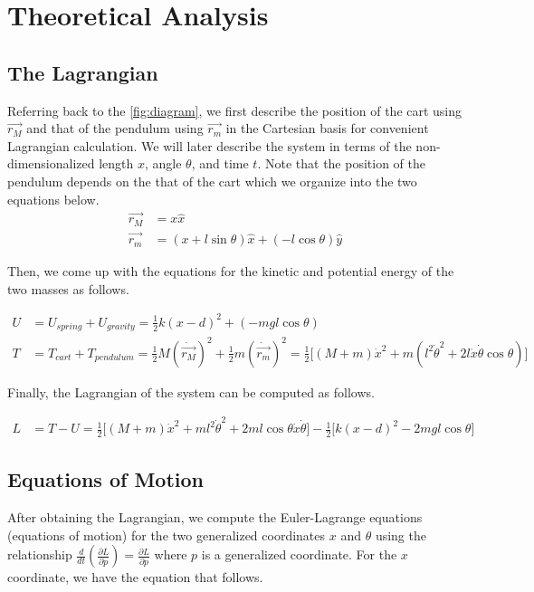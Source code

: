 \documentclass[12pt]{article}
\begin{document}
\section{Theoretical Analysis}
\subsection{The Lagrangian}

Referring back to the \autoref{fig:diagram}, we first describe the position of the cart using $\Vec{r_M}$ and that of the pendulum using $\Vec{r_m}$ in the Cartesian basis for convenient Lagrangian calculation. We will later describe the system in terms of the non-dimensionalized length $x$, angle $\theta$, and time $t$. Note that the position of the pendulum depends on the that of the cart which we organize into the two equations below.
\begin{align}
	\Vec{r_M} &= x \hat{x} \label{eq:r_M} \\
    \Vec{r_m} &= (x + l\sin{\theta}) \hat{x} + (-l\cos{\theta}) \hat{y} \label{eq:r_m}
\end{align}

Then, we come up with the equations for the kinetic and potential energy of the two masses as follows.

\begin{align}
	U &= U_{spring} + U_{gravity} = \frac{1}{2}k(x-d)^2 + (-mgl\cos{\theta})
      \label{eq:U} \\
    T &= T_{cart} + T_{pendulum} = \frac{1}{2}M(\dot{\Vec{r_M}})^2 + \frac{1}{2}m(\dot{\Vec{r_m}})^2 = \frac{1}{2} \big[ (M+m)\dot{x}^2 + m(l^2\dot{\theta}^2 + 2l\dot{x}\dot{\theta}\cos{\theta}) \big] \label{eq:T}
\end{align}

Finally, the Lagrangian of the system can be computed as follows.

\begin{align}
    L &= T - U = \frac{1}{2} \big[ (M+m)\dot{x}^2 + ml^2\dot{\theta}^2 + 2ml\cos{\theta}\dot{x}\dot{\theta}\big] - \frac{1}{2} \big[ k(x-d)^2 - 2mgl\cos{\theta} \big] \label{eq:L}
\end{align}

\subsection{Equations of Motion}

After obtaining the Lagrangian, we compute the Euler-Lagrange equations (equations of motion) for the two generalized coordinates $x$ and $\theta$ using the relationship $\frac{d}{dt} (\frac{\partial L}{\partial \dot{p}}) = \frac{\partial L}{\partial p}$ where $p$ is a generalized coordinate. For the $x$ coordinate, we have the equation that follows.
\end{document}
